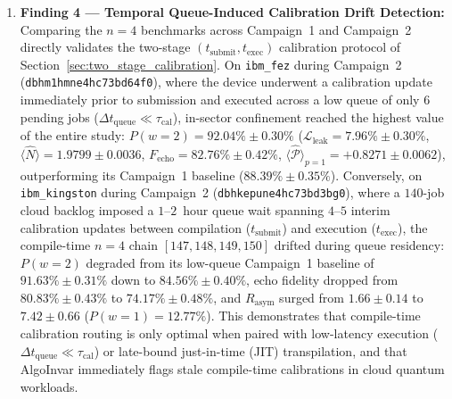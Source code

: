 \documentclass[aps,pra,reprint,superscriptaddress,floatfix,nofootinbib]{revtex4-2}
\begin{document}
\begin{enumerate}
    \item \textbf{Finding 4 --- Temporal Queue-Induced Calibration Drift Detection:}
    Comparing the $n = 4$ benchmarks across Campaign~1 and Campaign~2 directly validates the two-stage $(t_{\text{submit}}, t_{\text{exec}})$ calibration protocol of Section~\ref{sec:two_stage_calibration}. On \texttt{ibm\_fez} during Campaign~2 (\texttt{dbhm1hmne4hc73bd64f0}), where the device underwent a calibration update immediately prior to submission and executed across a low queue of only $6$ pending jobs ($\Delta t_{\text{queue}} \ll \tau_{\text{cal}}$), in-sector confinement reached the highest value of the entire study: $P(w=2) = 92.04\% \pm 0.30\%$ ($\mathcal{L}_{\text{leak}} = 7.96\% \pm 0.30\%$, $\langle \hat{N} \rangle = 1.9799 \pm 0.0036$, $F_{\text{echo}} = 82.76\% \pm 0.42\%$, $\langle \hat{\mathcal{P}} \rangle_{p=1} = +0.8271 \pm 0.0062$), outperforming its Campaign~1 baseline ($88.39\% \pm 0.35\%$). Conversely, on \texttt{ibm\_kingston} during Campaign~2 (\texttt{dbhkepune4hc73bd3bg0}), where a $140$-job cloud backlog imposed a $1$--$2$~hour queue wait spanning $4$--$5$ interim calibration updates between compilation ($t_{\text{submit}}$) and execution ($t_{\text{exec}}$), the compile-time $n = 4$ chain $[147, 148, 149, 150]$ drifted during queue residency: $P(w=2)$ degraded from its low-queue Campaign~1 baseline of $91.63\% \pm 0.31\%$ down to $84.56\% \pm 0.40\%$, echo fidelity dropped from $80.83\% \pm 0.43\%$ to $74.17\% \pm 0.48\%$, and $R_{\text{asym}}$ surged from $1.66 \pm 0.14$ to $7.42 \pm 0.66$ ($P(w=1) = 12.77\%$). This demonstrates that compile-time calibration routing is only optimal when paired with low-latency execution ($\Delta t_{\text{queue}} \ll \tau_{\text{cal}}$) or late-bound just-in-time (JIT) transpilation, and that AlgoInvar immediately flags stale compile-time calibrations in cloud quantum workloads.
\end{enumerate}
\end{document}
